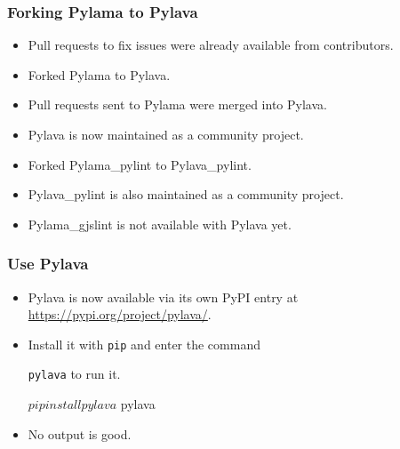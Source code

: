 \documentclass{beamer}
\newcommand{\inlinecode}[1]{
    \colorbox{black!10}{%
        \texttt{#1}%
    }
}
\begin{document}
\begin{frame}
    \frametitle{Forking Pylama to Pylava}

    \begin{itemize}
        \item
        Pull requests to fix issues were already available from
        contributors.

        \item
        Forked Pylama to Pylava.

        \item
        Pull requests sent to Pylama were merged into Pylava.

        \item
        Pylava is now maintained as a community project.

        \item
        Forked Pylama\_pylint to Pylava\_pylint.

        \item
        Pylava\_pylint is also maintained as a community project.

        \item
        Pylama\_gjslint is not available with Pylava yet.
    \end{itemize}
\end{frame}

\begin{frame}[fragile]
    \frametitle{Use Pylava}
    
    \begin{itemize}

    \item
    Pylava is now available via its own PyPI entry at
    \url{https://pypi.org/project/pylava/}.

    \item
    Install it with \inlinecode{pip} and enter the command
    \inlinecode{pylava} to run it.

\begin{plaincode}
$ pip install pylava
$ pylava
\end{plaincode}

    \item No output is good.

    \end{itemize}
\end{frame}


\end{document}
